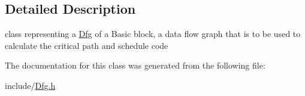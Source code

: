 \subsection{Detailed Description}
class representing a \mbox{\hyperlink{class_dfg}{Dfg}} of a Basic block, a data flow graph that is to be used to calculate the critical path and schedule code 

The documentation for this class was generated from the following file\+:\begin{DoxyCompactItemize}
\item 
include/\mbox{\hyperlink{_dfg_8h}{Dfg.\+h}}\end{DoxyCompactItemize}
